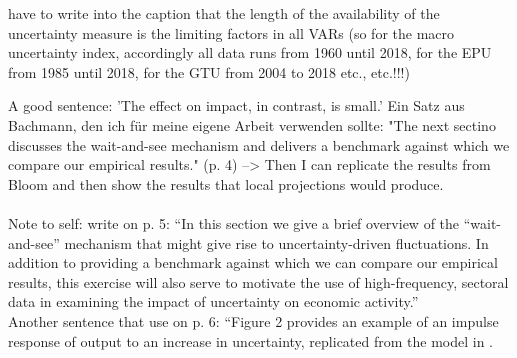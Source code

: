 \documentclass[a4paper,11pt,listof=nochaptergap,oneside,pointednumbers,bibtotoc,bigheadings,liststotoc]{scrbook}
\begin{document}
have to write into the caption that the length of the availability of the uncertainty measure is the limiting factors in all VARs (so for the macro uncertainty index, accordingly all data runs from 1960 until 2018, for the EPU from 1985 until 2018, for the GTU from 2004 to 2018 etc., etc.!!!)



A good sentence: 'The effect on impact, in contrast, is small.' 
Ein Satz aus Bachmann, den ich für meine eigene Arbeit verwenden sollte: "The next sectino discusses the wait-and-see mechanism and delivers a benchmark against which we compare our empirical results." (p. 4) --> Then I can replicate the results from Bloom and then show the results that local projections would produce.\\
\\
Note to self: \citet{bachmannetal:13} write on p. 5: ``In this section we give a brief overview of the ``wait-and-see'' mechanism that might give rise to uncertainty-driven fluctuations. In addition to providing a benchmark against which we can compare our empirical results, this exercise will also serve to motivate the use of high-frequency, sectoral data in examining the impact of uncertainty on economic activity.''\\
Another sentence that \citet{bachmannetal:13} use on p. 6: ``Figure 2 provides an example of an impulse response of output to an increase in uncertainty, replicated from the model in \citet{bloom:09}.


\end{document}
